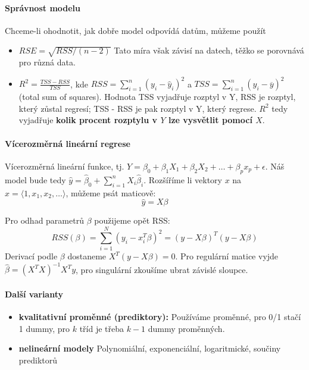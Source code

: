\documentclass[11pt]{report} %
\numberwithin{equation}{section}
\begin{document}
\paragraph{Správnost modelu}
Chceme-li ohodnotit, jak dobře model odpovídá datům, můžeme použít
\begin{itemize}
	\item $RSE = \sqrt{RSS / (n-2)}$ Tato míra však závisí na datech, těžko se porovnává pro různá data.
	
	\item $R^2 = \frac{TSS - RSS}{TSS}$, kde $RSS = \sum_{i=1}^{n}(y_i - \hat{y}_i)^2$ a $TSS = \sum_{i=1}^{n}(y_i - \overline{y})^2$ (total sum of squares). Hodnota TSS vyjadřuje rozptyl v Y, RSS je rozptyl, který zůstal  regresí; TSS - RSS je pak rozptyl v Y, který  regrese. $R^2$ tedy vyjadřuje \textbf{kolik procent rozptylu v $Y$ lze vysvětlit pomocí $X$}.
\end{itemize}
\paragraph{Vícerozměrná lineární regrese}
Vícerozměrná lineární funkce, tj. $Y = \beta_0 + \beta_1X_1 + \beta_2X_2 + \dots + \beta_px_p + \epsilon$. Náš model bude tedy $\hat{y} = \hat{\beta}_0 + \sum_{i=1}^{n}X_i\hat{\beta}_i$. Rozšíříme li vektory $x$ na $x = \langle1, x_1, x_2,\dots\rangle$, můžeme psát maticově:
$$\hat{y} = X\beta$$

Pro odhad parametrů $\beta$ použijeme opět RSS:
$$RSS(\beta) = \sum_{i=1}^{N}(y_i - x_i^T\beta)^2 = (y-X\beta)^T(y-X\beta)$$
Derivací podle $\beta$ dostaneme $X^T(y-X\beta) = 0$. Pro regulární matice vyjde $\hat{\beta} = (X^TX)^{-1}X^Ty$, pro singulární zkoušíme ubrat závislé sloupce.
		

\paragraph{Další varianty}
\begin{itemize}
\item \textbf{kvalitativní proměnné (prediktory):} Používáme  proměnné, pro 0/1 stačí 1 dummy, pro $k$ tříd je třeba $k-1$ dummy proměnných.

\item \textbf{nelineární modely} Polynomiální, exponenciální, logaritmické, součiny prediktorů
\end{itemize}
\end{document}
